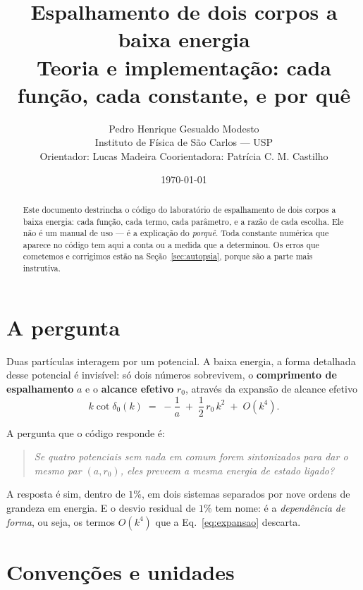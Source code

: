 \documentclass[11pt,a4paper]{article}
\title{\vspace{-1.5cm}\textbf{Espalhamento de dois corpos a baixa energia}\\[6pt]
       \large Teoria e implementação: cada função, cada constante, e por quê}
\author{Pedro Henrique Gesualdo Modesto\\
        \small Instituto de Física de São Carlos --- USP\\
        \small Orientador: Lucas Madeira \quad Coorientadora: Patrícia C. M. Castilho}
\date{\today}
\begin{document}
\maketitle

\begin{abstract}
\noindent
Este documento destrincha o código do laboratório de espalhamento de dois corpos
a baixa energia: cada função, cada termo, cada parâmetro, e a razão de cada
escolha. Ele não é um manual de uso --- é a explicação do \emph{porquê}. Toda
constante numérica que aparece no código tem aqui a conta ou a medida que a
determinou. Os erros que cometemos e corrigimos estão na Seção~\ref{sec:autopsia},
porque são a parte mais instrutiva.
\end{abstract}

\tableofcontents
\newpage

\section{A pergunta}

Duas partículas interagem por um potencial. A baixa energia, a forma detalhada
desse potencial é invisível: só dois números sobrevivem, o \textbf{comprimento
de espalhamento} $a$ e o \textbf{alcance efetivo} $r_0$, através da expansão de
alcance efetivo
\begin{equation}
  k\cot\delta_0(k) \;=\; -\frac{1}{a} \;+\; \frac{1}{2}\,r_0\,k^2 \;+\; O(k^4).
  \label{eq:expansao}
\end{equation}

A pergunta que o código responde é:

\begin{quote}
\emph{Se quatro potenciais sem nada em comum forem sintonizados para dar o mesmo
par $(a, r_0)$, eles preveem a mesma energia de estado ligado?}
\end{quote}

A resposta é sim, dentro de $1\%$, em dois sistemas separados por nove ordens de
grandeza em energia. E o desvio residual de $1\%$ tem nome: é a
\emph{dependência de forma}, ou seja, os termos $O(k^4)$ que a
Eq.~\eqref{eq:expansao} descarta.

\section{Convenções e unidades}
\end{document}
